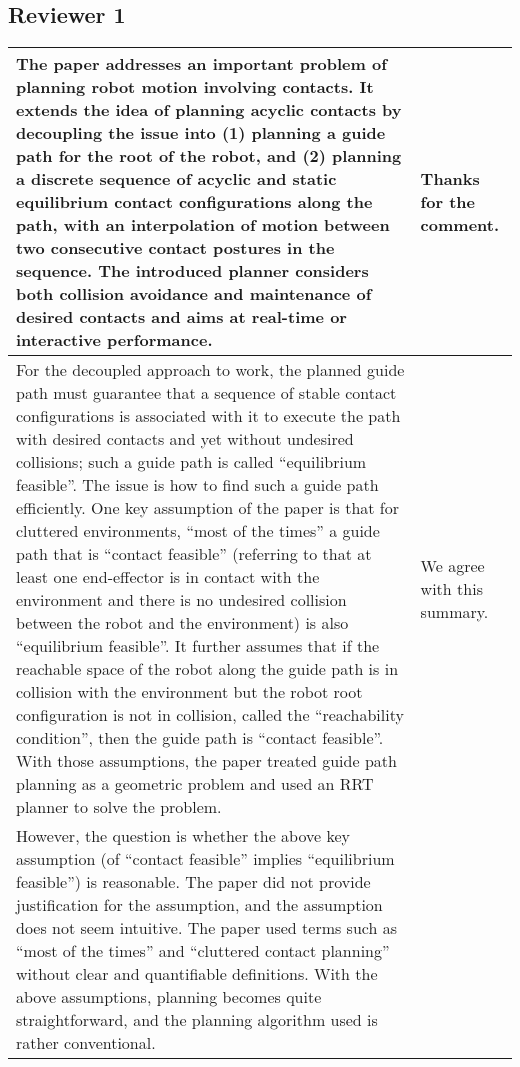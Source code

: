 \documentclass[a4paper]{article}
\begin{document}
\subsection{Reviewer 1}
\noindent
\begin{longtable}{|p{21em}|p{21em}|}
\hline
The paper addresses an important problem of planning robot motion involving contacts. It extends the idea of planning acyclic contacts by decoupling the issue into (1) planning a guide path for the root of the robot, and (2) planning a discrete sequence of acyclic and static equilibrium contact configurations along the path, with an interpolation of motion between two consecutive contact postures in the sequence. The introduced planner considers both collision avoidance and maintenance of desired contacts and aims at real-time or interactive performance. 
&Thanks for the comment.
\\ \hline %
For the decoupled approach to work, the planned guide path must guarantee that a sequence of stable contact configurations is associated with it to execute the path with desired contacts and yet without undesired collisions; such a guide path is called “equilibrium feasible”. The issue is how to find such a guide path efficiently. One key assumption of the paper is that for cluttered environments, “most of the times” a guide path that is “contact feasible” (referring to that at least one end-effector is in contact with the environment and there is no undesired collision between the robot and the environment) is also “equilibrium feasible”. It further assumes that if the reachable space of the robot along the guide path is in collision with the environment but the robot root configuration is not in collision, called the “reachability condition”, then the guide path is “contact feasible”. With those assumptions, the paper treated guide path planning as a geometric problem and used an RRT planner to solve the problem. 
& We agree with this summary.
\\ \hline %
However, the question is whether the above key assumption (of 
“contact feasible” implies “equilibrium feasible”) is reasonable. The paper did not provide justification for the assumption, and the assumption does not seem intuitive. The paper used terms such as “most of the times” and “cluttered contact planning” without clear and quantifiable definitions. With the above assumptions, planning becomes quite straightforward, and the planning algorithm used is rather conventional. 

\end{longtable}
\end{document}
